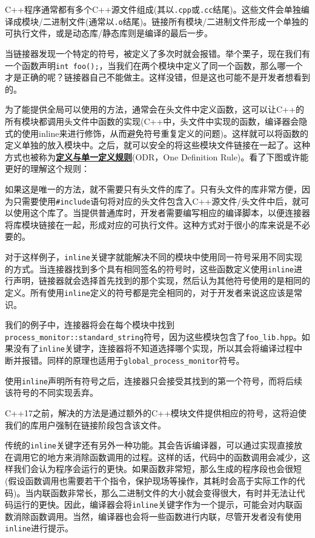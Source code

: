 
C++程序通常都有多个C++源文件组成(其以\texttt{.cpp}或\texttt{.cc}结尾)。这些文件会单独编译成模块/二进制文件(通常以\texttt{.o}结尾)。链接所有模块/二进制文件形成一个单独的可执行文件，或是动态库/静态库则是编译的最后一步。

当链接器发现一个特定的符号，被定义了多次时就会报错。举个栗子，现在我们有一个函数声明\texttt{int foo();}，当我们在两个模块中定义了同一个函数，那么哪一个才是正确的呢？链接器自己不能做主。这样没错，但是这也可能不是开发者想看到的。

为了能提供全局可以使用的方法，通常会在头文件中定义函数，这可以让C++的所有模块都调用头文件中函数的实现(C++中，头文件中实现的函数，编译器会隐式的使用inline来进行修饰，从而避免符号重复定义的问题)。这样就可以将函数的定义单独的放入模块中。之后，就可以安全的将这些模块文件链接在一起了。这种方式也被称为\href{http://zh.cppreference.com/w/cpp/language/definition}{\textbf{定义与单一定义规则}}(ODR，One Definition Rule)。看了下图或许能更好的理解这个规则：


如果这是唯一的方法，就不需要只有头文件的库了。只有头文件的库非常方便，因为只需要使用\texttt{\#include}语句将对应的头文件包含入C++源文件/头文件中后，就可以使用这个库了。当提供普通库时，开发者需要编写相应的编译脚本，以便连接器将库模块链接在一起，形成对应的可执行文件。这种方式对于很小的库来说是不必要的。

对于这样例子，\texttt{inline}关键字就能解决不同的模块中使用同一符号采用不同实现的方式。当连接器找到多个具有相同签名的符号时，这些函数定义使用\texttt{inline}进行声明，链接器就会选择首先找到的那个实现，然后认为其他符号使用的是相同的定义。所有使用\texttt{inline}定义的符号都是完全相同的，对于开发者来说这应该是常识。

我们的例子中，连接器将会在每个模块中找到\texttt{process\_monitor::standard\_string}符号，因为这些模块包含了\texttt{foo\_lib.hpp}。如果没有了\texttt{inline}关键字，连接器将不知道选择哪个实现，所以其会将编译过程中断并报错。同样的原理也适用于\texttt{global\_process\_monitor}符号。

使用\texttt{inline}声明所有符号之后，连接器只会接受其找到的第一个符号，而将后续该符号的不同实现丢弃。

C++17之前，解决的方法是通过额外的C++模块文件提供相应的符号，这将迫使我们的库用户强制在链接阶段包含该文件。

传统的\texttt{inline}关键字还有另外一种功能。其会告诉编译器，可以通过实现直接放在调用它的地方来消除函数调用的过程。这样的话，代码中的函数调用会减少，这样我们会认为程序会运行的更快。如果函数非常短，那么生成的程序段也会很短(假设函数调用也需要若干个指令，保护现场等操作，其耗时会高于实际工作的代码)。当内联函数非常长，那么二进制文件的大小就会变得很大，有时并无法让代码运行的更快。因此，编译器会将\texttt{inline}关键字作为一个提示，可能会对内联函数消除函数调用。当然，编译器也会将一些函数进行内联，尽管开发者没有使用\texttt{inline}进行提示。

